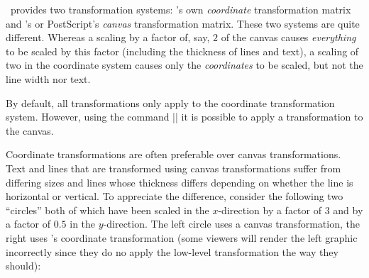 \label{section-design-transformations}

\pgfname\ provides two transformation systems: \pgfname's own
\emph{coordinate} transformation matrix and \pdf's or PostScript's
\emph{canvas} transformation matrix. These two systems are quite
different. Whereas a scaling by a factor of, say, $2$ of the canvas
causes \emph{everything} to be scaled by this factor (including
the thickness of lines and text), a scaling of two in the coordinate 
system causes only the \emph{coordinates} to be scaled, but not the
line width nor text.

By default, all transformations only apply to the coordinate
transformation system. However, using the command |\pgflowlevel|
it is possible to apply a transformation to the canvas.

Coordinate transformations are often preferable over canvas
transformations. Text and lines that are transformed using canvas 
transformations suffer from differing sizes and lines whose thickness 
differs depending on whether the line is horizontal or vertical. To
appreciate the difference, consider the following two ``circles'' both
of which have been scaled in the $x$-direction by a factor of $3$ and
by a factor of $0.5$ in the $y$-direction. The left circle uses a
canvas transformation, the right uses \pgfname's coordinate
transformation (some viewers will render the left graphic incorrectly
since they do no apply the low-level transformation the way they
should):  



